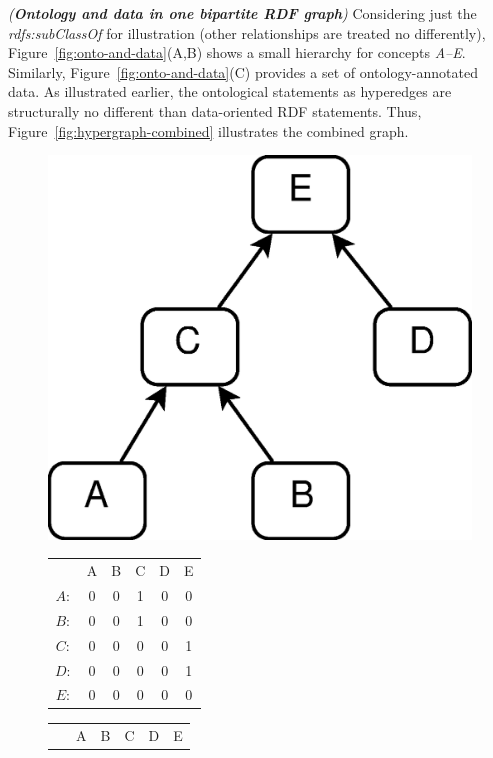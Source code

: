 \begin{myexp}
\emph{(\textbf{Ontology and data in one bipartite RDF graph})}
Considering just the \emph{rdfs:subClassOf} for illustration (other relationships are treated no differently), Figure~\ref{fig:onto-and-data}(A,B) shows a small hierarchy for concepts \emph{A--E}. Similarly, Figure~\ref{fig:onto-and-data}(C) provides a set of ontology-annotated data. As illustrated earlier, the ontological statements as hyperedges are structurally no different than data-oriented RDF statements. Thus, Figure~\ref{fig:hypergraph-combined} illustrates the combined graph.
\end{myexp}

\begin{figure}[tbh]
\begin{minipage}[c]{.4\textwidth}\centering
\includegraphics[width=.5\linewidth]{fig/simple-onto.eps}
\end{minipage}
\begin{minipage}[c]{.25\textwidth}\centering
    \begin{tabular}{ c | c | c | c | c | c |}
    \cline{2-6}
    	~ & A & B & C & D & E\\
    \cline{2-6}
    $A:$& 0 & 0 & 1 & 0 & 0 \\
    \cline{2-6}
    $B:$& 0 & 0 & 1 & 0 & 0 \\
    \cline{2-6}
    $C:$& 0 & 0 & 0 & 0 & 1 \\
    \cline{2-6}
    $D:$& 0 & 0 & 0 & 0 & 1 \\
    \cline{2-6}
    $E:$& 0 & 0 & 0 & 0 & 0 \\
    \cline{2-6}
    \end{tabular}
\end{minipage}
\begin{minipage}[c]{.25\textwidth}\centering
    \begin{tabular}{ c | c | c | c | c | c |}
    \cline{2-6}
    	~ & A & B & C & D & E\\

\end{tabular}
\end{minipage}
\end{figure}
